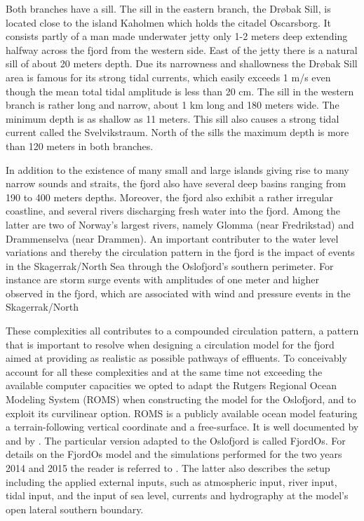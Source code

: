Both branches have a sill. The sill in the eastern branch, the Dr{\o}bak Sill, is located close to the island Kaholmen which holds the citadel Oscarsborg. It consists partly of a man made underwater jetty only 1-2 meters deep extending halfway across the fjord from the western side. East of the jetty there is a natural sill of about 20 meters depth. Due its narrowness and shallowness the Dr{\o}bak Sill area is famous for its strong tidal currents, which easily exceeds 1 m/s even though the mean total tidal amplitude is less than 20 cm. The sill in the western branch is rather long and narrow, about 1 km long and 180 meters wide. The minimum depth is as shallow as 11 meters. This sill also causes a strong tidal current called the Svelvikstraum. North of the sills the maximum depth is more than 120 meters in both branches. 

In addition to the existence of many small and large islands giving rise to many narrow sounds and straits, the fjord also have several deep basins ranging from 190 to 400 meters depths. Moreover, the fjord also exhibit a rather irregular coastline, and several rivers discharging fresh water into the fjord. Among the latter are two of Norway's largest rivers, namely Glomma (near Fredrikstad) and Drammenselva (near Drammen). An important contributer to the water level variations and thereby the circulation pattern in the fjord is the impact of events in the Skagerrak/North Sea through the Oslofjord's southern perimeter. For instance are storm surge events with amplitudes of one meter and higher observed in the fjord, which are associated with wind and pressure events in the Skagerrak/North

These complexities all contributes to a compounded circulation pattern, a pattern that is important to resolve when designing a circulation model for the fjord aimed at providing as realistic as possible pathways of effluents. To conceivably account for all these complexities and at the same time not exceeding the available computer capacities we opted to adapt the Rutgers Regional Ocean Modeling System (ROMS) when constructing the model for the Oslofjord, and to exploit its curvilinear option. ROMS is a publicly available ocean model featuring a terrain-following vertical coordinate and a free-surface. It is well documented by \cite{haidv:etal:2008} and by \cite{shche:mcwil:2003,shche:mcwil:2005,shche:mcwil:2009}. The particular version adapted to the Oslofjord is called FjordOs. For details on the FjordOs model and the simulations performed for the two years 2014 and 2015 the reader is referred to \cite{roed:etal:2016}. The latter also describes the setup including the applied external inputs, such as atmospheric input, river input, tidal input, and the input of sea level, currents and hydrography at the model's open lateral southern boundary.

